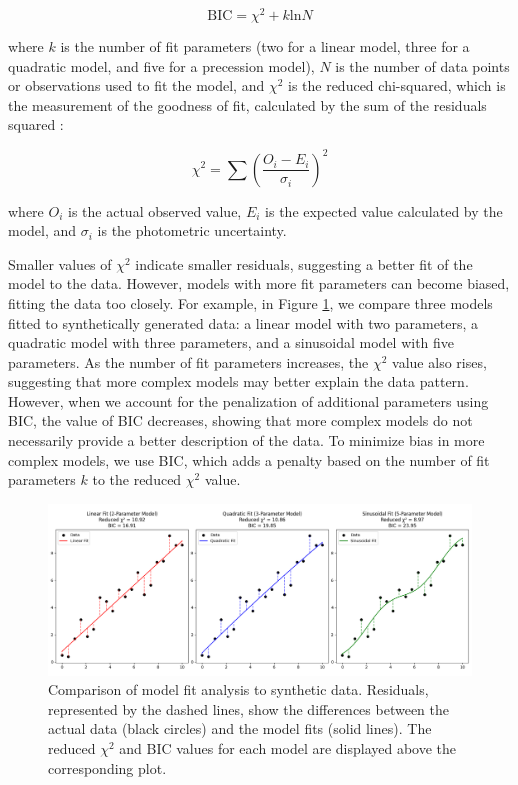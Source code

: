 \documentclass[oneside,12pt]{amsart}
\numberwithin{page}{section}
\begin{document}
\begin{equation}
    \text{BIC} = \chi^{2} + k\text{ln}N
\end{equation}

where $k$ is the number of fit parameters (two for a linear model, three for a quadratic model, and five for a precession model), $N$ is the number of data points or observations used to fit the model, and $\chi^{2}$ is the reduced chi-squared, which is the measurement of the goodness of fit, calculated by the sum of the residuals squared \citep{pearson1900criterion}:

\begin{equation}
    \chi^{2} = \sum \left( \frac{O_i - E_i}{\sigma_i} \right)^2
\end{equation}

where $O_i$ is the actual observed value, $E_i$ is the expected value calculated by the model, and $\sigma_i$ is the photometric uncertainty.

Smaller values of $\chi^2$ indicate smaller residuals, suggesting a better fit of the model to the data. However, models with more fit parameters can become biased, fitting the data too closely. For example, in Figure \ref{fig:reduced-chi-squared}, we compare three models fitted to synthetically generated data: a linear model with two parameters, a quadratic model with three parameters, and a sinusoidal model with five parameters. As the number of fit parameters increases, the $\chi^2$ value also rises, suggesting that more complex models may better explain the data pattern. However, when we account for the penalization of additional parameters using BIC, the value of BIC decreases, showing that more complex models do not necessarily provide a better description of the data. To minimize bias in more complex models, we use BIC, which adds a penalty based on the number of fit parameters $k$ to the reduced $\chi^2$ value.

\begin{figure}[htbp]
    \centering
    \includegraphics[width=\linewidth]{figs/reduced_chi_squared.png}
    \caption{Comparison of model fit analysis to synthetic data. Residuals, represented by the dashed lines, show the differences between the actual data (black circles) and the model fits (solid lines). The reduced $\chi^2$ and BIC values for each model are displayed above the corresponding plot.}
    \label{fig:reduced-chi-squared}
\end{figure}
\end{document}
